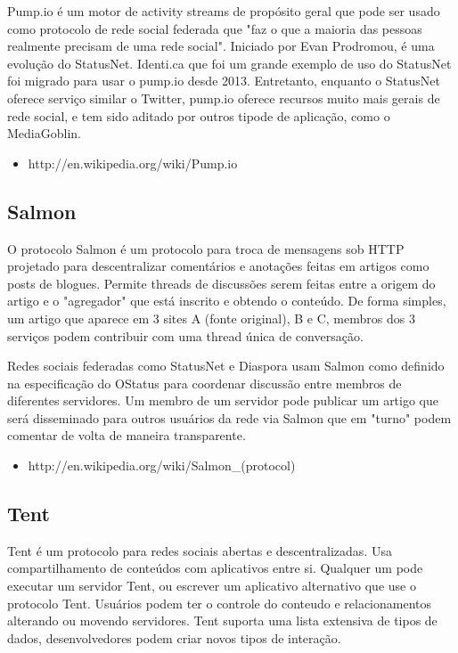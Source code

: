 \documentclass[12pt]{article}
\begin{document}
Pump.io é um motor de activity streams de propósito geral que pode ser usado
como protocolo de rede social federada que "faz o que a maioria das pessoas
realmente precisam de uma rede social". Iniciado por Evan Prodromou, é uma
evolução do StatusNet. Identi.ca que foi um grande exemplo de uso do StatusNet
foi migrado para usar o pump.io desde 2013. Entretanto, enquanto o StatusNet
oferece serviço similar o Twitter, pump.io oferece recursos muito mais gerais
de rede social, e tem sido aditado por outros tipode de aplicação, como o
MediaGoblin.


\begin{itemize}
  \item http://en.wikipedia.org/wiki/Pump.io
\end{itemize}

\subsection{Salmon}

O protocolo Salmon é um protocolo para troca de mensagens sob HTTP projetado
para descentralizar comentários e anotações feitas em artigos como posts de
blogues. Permite threads de discussões serem feitas entre a origem do artigo e
o "agregador" que está inscrito e obtendo o conteúdo. De forma simples, um
artigo que aparece em 3 sites A (fonte original), B e C, membros dos 3
serviços podem contribuir com uma thread única de conversação.

Redes sociais federadas como StatusNet e Diaspora usam Salmon como definido na
especificação do OStatus para coordenar discussão entre membros de diferentes
servidores. Um membro de um servidor pode publicar um artigo que será
disseminado para outros usuários da rede via Salmon que em "turno" podem
comentar de volta de maneira transparente.

\begin{itemize}
  \item http://en.wikipedia.org/wiki/Salmon\_(protocol)
\end{itemize}

\subsection{Tent}

Tent é um protocolo para redes sociais abertas e descentralizadas. Usa
compartilhamento de conteúdos com aplicativos entre si. Qualquer um pode
executar um servidor Tent, ou escrever um aplicativo alternativo que use o
protocolo Tent. Usuários podem ter o controle do conteudo e relacionamentos
alterando ou movendo servidores. Tent suporta uma lista extensiva de tipos de
dados, desenvolvedores podem criar novos tipos de interação.
\end{document}
